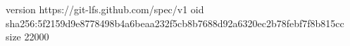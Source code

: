 version https://git-lfs.github.com/spec/v1
oid sha256:5f2159d9e8778498b4a6beaa232f5cb8b7688d92a6320ec2b78febf7f8b815cc
size 22000
